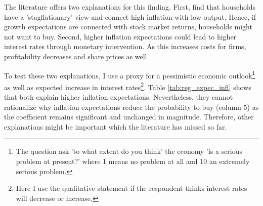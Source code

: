 \documentclass[ProjectABM]{subfiles}
\begin{document}








The literature offers two explanations for this finding. First, \cite{CCG_2020_inflation_communication} find that households have a 'stagflationary' view and connect high inflation with low output. Hence, if growth expectations are connected with stock market returns, households might not want to buy. Second, higher inflation expectations could lead to higher interest rates through monetary intervention. As this increases costs for firms, profitability decreases and share prices as well. 

To test these two explanations, I use a proxy for a pessimistic economic outlook\footnote{The question ask 'to what extent do you think' the economy 'is a serious problem at present?' where 1 means no problem at all and 10 an extremely serious problem.} as well as expected increase in interest rates\footnote{Here I use the qualitative statement if the respondent thinks interest rates will decrease or increase.}. Table \ref{tab:reg_expec_infl} shows that both explain higher inflation expectations. Nevertheless, they cannot rationalize why inflation expectations reduce the probability to buy (column 5) as the coefficient remains significant and unchanged in magnitude. Therefore, other explanations might be important which the literature has missed so far.

\end{document}
